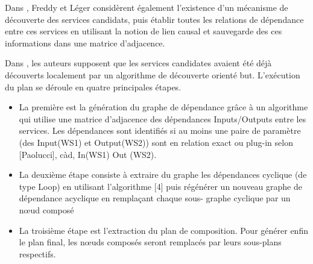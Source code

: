 
  Dans \cite{lecue2006formal}, Freddy et Léger considèrent également
  l'existence d'un mécanisme de découverte des services candidats,
  puis établir toutes les relations de dépendance entre ces services
  en utilisant la notion de lien causal et sauvegarde des ces
  informations dans une matrice d'adjacence.



  Dans \cite{omer2009dependency}, les auteurs supposent que les
  services candidates avaient été déjà découverts localement par un
  algorithme de découverte orienté but. L'exécution du plan se déroule
  en quatre principales étapes.

  \SpecialItem
  \begin{itemize}
  \item La première est la génération du graphe de dépendance grâce à
    un algorithme qui utilise une matrice d'adjacence des dépendances
    Inputs/Outputs entre les services. Les dépendances sont identifiés
    si au moins une paire de paramètre (des Input(WS1) et Output(WS2))
    sont en relation exact ou plug-in selon [Paolucci], càd, In(WS1)
    Out (WS2).

  \item La deuxième étape consiste à extraire du graphe les
    dépendances cyclique (de type Loop) en utilisant l'algorithme [4]
    puis régénérer un nouveau graphe de dépendance acyclique en
    remplaçant chaque sous- graphe cyclique par un nœud composé

  \item La troisième étape est l'extraction du plan de
    composition. Pour générer enfin le plan final, les nœuds composés
    seront remplacés par leurs sous-plans respectifs.
  \end{itemize}

